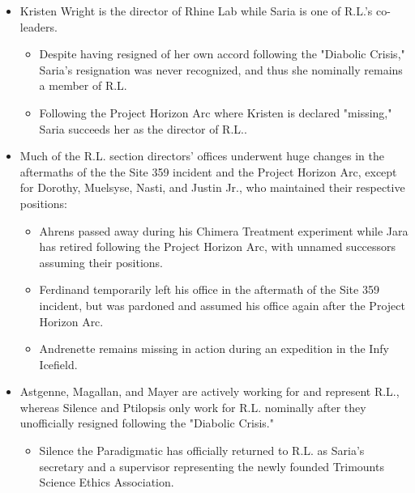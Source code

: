 \documentclass[12pt]{article}
\begin{document}
\begin{multicols}{2}
\begin{itemize}
    \item Kristen Wright is the director of Rhine Lab while Saria is one of R.L.'s co-leaders.
    \begin{itemize}
        \item Despite having resigned of her own accord following the "Diabolic Crisis," Saria's resignation was never recognized, and thus she nominally remains a member of R.L.
        \item Following the Project Horizon Arc where Kristen is declared "missing," Saria succeeds her as the director of R.L..
    \end{itemize}
    \item Much of the R.L. section directors' offices underwent huge changes in the aftermaths of the the Site 359 incident and the Project Horizon Arc, except for Dorothy, Muelsyse, Nasti, and Justin Jr., who maintained their respective positions\cite{7}:
    \begin{itemize}
        \item Ahrens passed away during his Chimera Treatment experiment while Jara has retired following the Project Horizon Arc, with unnamed successors assuming their positions.
        \item Ferdinand temporarily left his office in the aftermath of the Site 359 incident, but was pardoned and assumed his office again after the Project Horizon Arc.
        \item Andrenette remains missing in action during an expedition in the Infy Icefield.
    \end{itemize}
    \item Astgenne, Magallan, and Mayer are actively working for and represent R.L., whereas Silence and Ptilopsis only work for R.L. nominally after they unofficially resigned following the "Diabolic Crisis."
    \begin{itemize}
        \item Silence the Paradigmatic has officially returned to R.L. as Saria's secretary and a supervisor representing the newly founded Trimounts Science Ethics Association.
    \end{itemize}
\end{itemize}


\end{multicols}
\end{document}
